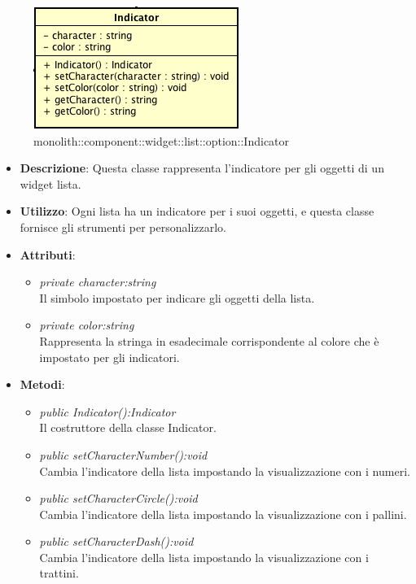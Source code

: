 \label{monolith::component::widget::list::option::Indicator}
\begin{figure}[H]
	\centering
	\includegraphics[scale=0.5]{Sezioni/SottosezioniST/img/Indicator.png}
	\caption{monolith::component::widget::list::option::Indicator}
\end{figure}

\begin{itemize}
\item \textbf{Descrizione}: Questa classe rappresenta l'indicatore per gli oggetti di un widget lista.
\item \textbf{Utilizzo}: Ogni lista ha un indicatore per i suoi oggetti, e questa classe fornisce gli strumenti per personalizzarlo.
\item \textbf{Attributi}:
	\begin{itemize}
	\item \textit{private character:string}\\
	Il simbolo impostato per indicare gli oggetti della lista.
	\item \textit{private color:string}\\
	Rappresenta la stringa in esadecimale corrispondente al colore che è impostato per gli indicatori.
	\end{itemize}
\item \textbf{Metodi}:
	\begin{itemize}
	\item \textit{public Indicator():Indicator}\\
	Il costruttore della classe Indicator.
	\item \textit{public setCharacterNumber():void}\\
	Cambia l'indicatore della lista impostando la visualizzazione con i numeri.
	\item \textit{public setCharacterCircle():void}\\
	Cambia l'indicatore della lista impostando la visualizzazione con i pallini.
	\item \textit{public setCharacterDash():void}\\
	Cambia l'indicatore della lista impostando la visualizzazione con i trattini.

\end{itemize}
\end{itemize}
